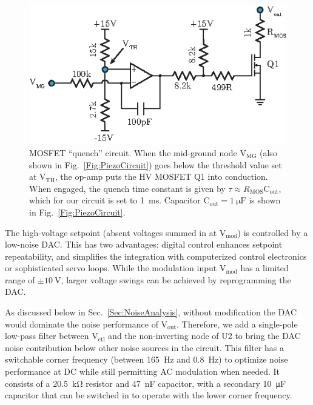 \documentclass[aip,rsi,reprint]{revtex4-1} %
\begin{document}
\begin{figure}[t!]
\includegraphics[width=\columnwidth]{MOS}
\caption{MOSFET ``quench'' circuit.
When the mid-ground node $\text{V}_\text{MG}$ (also shown in Fig.~\ref{Fig:PiezoCircuit}) goes below the threshold value set at $\text{V}_\text{TH}$, the op-amp puts the HV MOSFET Q1 into conduction.
When engaged, the quench time constant is given by $\tau \approx R_\text{MOS} \text{C}_\text{out}$, which for our circuit is set to \SI{1}{\milli\second}. Capacitor $\text{C}_\text{out}=\SI{1}{\micro\farad}$ is shown in Fig.~\ref{Fig:PiezoCircuit}.
\label{Fig:MOS}}
\end{figure}

The high-voltage setpoint (absent voltages summed in at $\text{V}_\text{mod}$) is controlled by a low-noise DAC.
This has two advantages: digital control enhances setpoint repeatability, and simplifies the integration with computerized control electronics or sophisticated servo loops.
While the modulation input $\text{V}_\text{mod}$ has a limited range of $\pm\SI{10}{\volt}$, larger voltage swings can be achieved by reprogramming the DAC.

As discussed below in Sec.~\ref{Sec:NoiseAnalysis}, without modification the DAC would dominate the noise performance of $\text{V}_\text{out}$.
Therefore, we add a single-pole low-pass filter between $\text{V}_\text{ctl}$ and the non-inverting node of U2 to bring the DAC noise contribution below other noise sources in the circuit.
This filter has a switchable corner frequency (between \SI{165}{\hertz} and \SI{0.8}{\hertz}) to optimize noise performance at DC while still permitting AC modulation when needed.
It consists of a \SI{20.5}{\kilo\ohm} resistor and \SI{47}{\nano\farad} capacitor, with a secondary \SI{10}{\micro\farad} capacitor that can be switched in to operate with the lower corner frequency.
\end{document}
